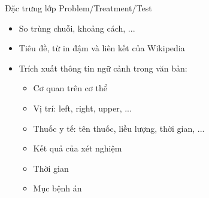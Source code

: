 \begin{frame}{Đặc trưng lớp Problem/Treatment/Test}
\putlogo
\begin{itemize}
	\item So trùng chuỗi, khoảng cách, ...
	\item Tiêu đề, từ in đậm và liên kết của {\color{red} Wikipedia}
	\item Trích xuất thông tin ngữ cảnh trong văn bản:
	\begin{itemize}
		\item Cơ quan trên cơ thể
		\item Vị trí: left, right, upper, ...
		\item Thuốc y tế: tên thuốc, liều lượng, thời gian, ...
		\item Kết quả của xét nghiệm
		\item Thời gian
		\item Mục bệnh án
	\end{itemize}
\end{itemize}
\end{frame}

